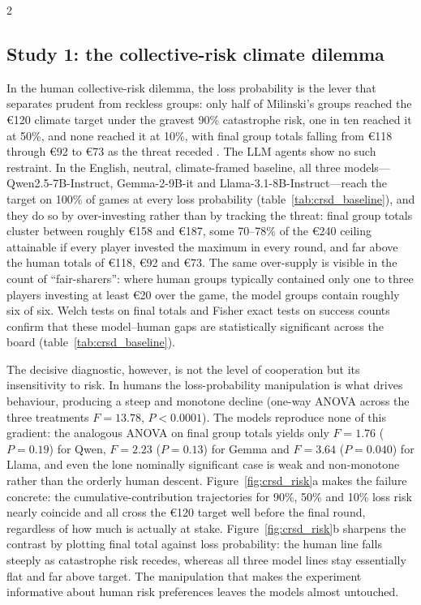 \documentclass[openacc]{rsproca_new}%
\begin{document}
\begin{multicols}{2}
\subsection{Study 1: the collective-risk climate dilemma}

In the human collective-risk dilemma, the loss probability is the lever that separates prudent from reckless groups: only half of Milinski's groups reached the €120 climate target under the gravest 90\% catastrophe risk, one in ten reached it at 50\%, and none reached it at 10\%, with final group totals falling from €118 through €92 to €73 as the threat receded \cite{milinski2008climate}. The LLM agents show no such restraint. In the English, neutral, climate-framed baseline, all three models---Qwen2.5-7B-Instruct, Gemma-2-9B-it and Llama-3.1-8B-Instruct---reach the target on 100\% of games at every loss probability (table~\ref{tab:crsd_baseline}), and they do so by over-investing rather than by tracking the threat: final group totals cluster between roughly €158 and €187, some 70--78\% of the €240 ceiling attainable if every player invested the maximum in every round, and far above the human totals of €118, €92 and €73. The same over-supply is visible in the count of ``fair-sharers'': where human groups typically contained only one to three players investing at least €20 over the game, the model groups contain roughly six of six. Welch tests on final totals and Fisher exact tests on success counts confirm that these model--human gaps are statistically significant across the board (table~\ref{tab:crsd_baseline}).

The decisive diagnostic, however, is not the level of cooperation but its insensitivity to risk. In humans the loss-probability manipulation is what drives behaviour, producing a steep and monotone decline (one-way ANOVA across the three treatments $F=13.78$, $P<0.0001$). The models reproduce none of this gradient: the analogous ANOVA on final group totals yields only $F=1.76$ ($P=0.19$) for Qwen, $F=2.23$ ($P=0.13$) for Gemma and $F=3.64$ ($P=0.040$) for Llama, and even the lone nominally significant case is weak and non-monotone rather than the orderly human descent. Figure~\ref{fig:crsd_risk}a makes the failure concrete: the cumulative-contribution trajectories for 90\%, 50\% and 10\% loss risk nearly coincide and all cross the €120 target well before the final round, regardless of how much is actually at stake. Figure~\ref{fig:crsd_risk}b sharpens the contrast by plotting final total against loss probability: the human line falls steeply as catastrophe risk recedes, whereas all three model lines stay essentially flat and far above target. The manipulation that makes the experiment informative about human risk preferences leaves the models almost untouched.


\end{multicols}
\end{document}
